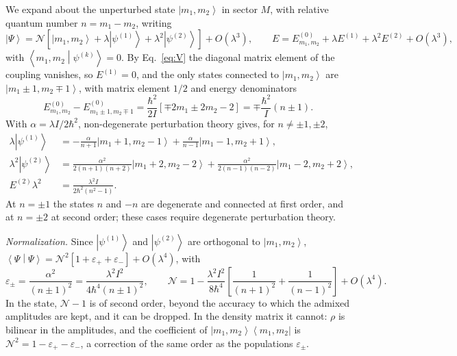 \documentclass[aps,preprint,12pt,superscriptaddress,nofootinbib]{revtex4-2}
\newcommand{\ket}[1]{\left|#1\right\rangle}
\newcommand{\braket}[2]{\left\langle#1\middle|#2\right\rangle}
\newcommand{\ketbra}[2]{\left|#1\right\rangle\!\left\langle#2\right|}
\newcommand{\epsp}{\varepsilon_{+}}
\newcommand{\epsm}{\varepsilon_{-}}
\begin{document}
We expand about the unperturbed state $\ket{m_{1},m_{2}}$ in sector $M$, with
relative quantum number $n=m_{1}-m_{2}$, writing
\begin{equation}
\ket{\Psi}=\mathcal{N}\left[\ket{m_{1},m_{2}}+\lambda\ket{\psi^{(1)}}
+\lambda^{2}\ket{\psi^{(2)}}\right]+O(\lambda^{3}),\qquad
E=E^{(0)}_{m_{1},m_{2}}+\lambda E^{(1)}+\lambda^{2}E^{(2)}+O(\lambda^{3}),
\label{eq:ptexp}
\end{equation}
with $\braket{m_{1},m_{2}}{\psi^{(k)}}=0$. By Eq.~\eqref{eq:V} the diagonal matrix
element of the coupling vanishes, so $E^{(1)}=0$, and the only states connected to
$\ket{m_{1},m_{2}}$ are $\ket{m_{1}\pm1,m_{2}\mp1}$, with matrix element $1/2$ and
energy denominators
\begin{equation}
E^{(0)}_{m_{1},m_{2}}-E^{(0)}_{m_{1}\pm1,m_{2}\mp1}
=\frac{\hbar^{2}}{2I}\left[\mp2m_{1}\pm2m_{2}-2\right]=\mp\frac{\hbar^{2}}{I}(n\pm1).
\label{eq:denoms}
\end{equation}
With $\alpha=\lambda I/2\hbar^{2}$, non-degenerate perturbation theory gives, for
$n\neq\pm1,\pm2$,
\begin{align}
\lambda\ket{\psi^{(1)}}&=-\frac{\alpha}{n+1}\ket{m_{1}+1,m_{2}-1}
+\frac{\alpha}{n-1}\ket{m_{1}-1,m_{2}+1},\label{eq:psi1}\\
\lambda^{2}\ket{\psi^{(2)}}&=\frac{\alpha^{2}}{2(n+1)(n+2)}\ket{m_{1}+2,m_{2}-2}
+\frac{\alpha^{2}}{2(n-1)(n-2)}\ket{m_{1}-2,m_{2}+2},\label{eq:psi2}\\
E^{(2)}\lambda^{2}&=\frac{\lambda^{2}I}{2\hbar^{2}(n^{2}-1)} .\label{eq:E2}
\end{align}
At $n=\pm1$ the states $n$ and $-n$ are degenerate and connected at first order, and
at $n=\pm2$ at second order; these cases require degenerate perturbation theory.

\emph{Normalization.} Since $\ket{\psi^{(1)}}$ and $\ket{\psi^{(2)}}$ are orthogonal to
$\ket{m_{1},m_{2}}$,
$\braket{\Psi}{\Psi}=\mathcal{N}^{2}[1+\epsp+\epsm]+O(\lambda^{4})$, with
\begin{equation}
\varepsilon_{\pm}=\frac{\alpha^{2}}{(n\pm1)^{2}}=\frac{\lambda^{2}I^{2}}{4\hbar^{4}(n\pm1)^{2}},
\qquad
\mathcal{N}=1-\frac{\lambda^{2}I^{2}}{8\hbar^{4}}\left[\frac{1}{(n+1)^{2}}
+\frac{1}{(n-1)^{2}}\right]+O(\lambda^{4}).
\label{eq:norm}
\end{equation}
In the state, $\mathcal{N}-1$ is of second order, beyond the accuracy to which the
admixed amplitudes are kept, and it can be dropped. In the density matrix it cannot:
$\rho$ is bilinear in the amplitudes, and the coefficient of
$\ketbra{m_{1},m_{2}}{m_{1},m_{2}}$ is $\mathcal{N}^{2}=1-\epsp-\epsm$, a correction of
the same order as the populations $\varepsilon_{\pm}$.
\end{document}

